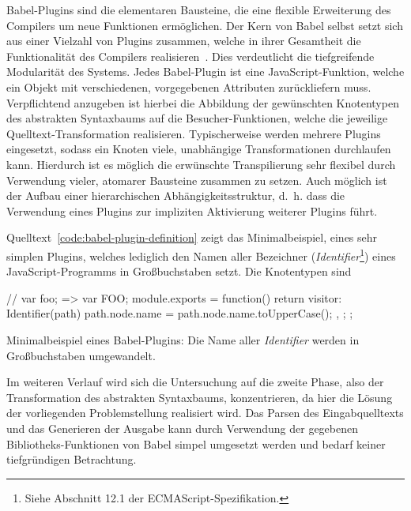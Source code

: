 Babel-Plugins sind die elementaren Bausteine, die eine flexible Erweiterung des Compilers um neue Funktionen ermöglichen. Der Kern von Babel selbst setzt sich aus einer Vielzahl von Plugins zusammen, welche in ihrer Gesamtheit die Funktionalität des Compilers realisieren~\autocite{BABEL}. Dies verdeutlicht die tiefgreifende Modularität des Systems. Jedes Babel-Plugin ist eine JavaScript-Funktion, welche ein Objekt mit verschiedenen, vorgegebenen Attributen zurückliefern muss. Verpflichtend anzugeben ist hierbei die Abbildung der gewünschten Knotentypen des abstrakten Syntaxbaums auf die Besucher-Funktionen, welche die jeweilige Quelltext-Transformation realisieren. Typischerweise werden mehrere Plugins eingesetzt, sodass ein Knoten viele, unabhängige Transformationen durchlaufen kann. Hierdurch ist es möglich die erwünschte Transpilierung sehr flexibel durch Verwendung vieler, atomarer Bausteine zusammen zu setzen. Auch möglich ist der Aufbau einer hierarchischen Abhängigkeitsstruktur, d.~h. dass die Verwendung eines Plugins zur impliziten Aktivierung weiterer Plugins führt.

Quelltext~\ref{code:babel-plugin-definition} zeigt das Minimalbeispiel, eines sehr simplen Plugins, welches lediglich den Namen aller Bezeichner (\textit{Identifier}\footnote{Siehe Abschnitt 12.1 der ECMAScript-Spezifikation\autocite[187\psqq]{ECMASCRIPT:2019}.}) eines JavaScript-Programms in Großbuchstaben setzt. Die Knotentypen sind

\bigskip
\begin{listing}[htb]
\begin{jscode}
// var foo; => var FOO;
module.exports = function() {
  return {
    visitor: {
      Identifier(path) {
        path.node.name = path.node.name.toUpperCase();
      },
    }
  };
};
\end{jscode}
\caption[Minimalbeispiel eines Babel-Plugins]{Minimalbeispiel eines Babel-Plugins: Die Name aller \textit{Identifier} werden in Großbuchstaben umgewandelt.}
\label{code:babel-plugin-definition}
\end{listing}

Im weiteren Verlauf wird sich die Untersuchung auf die zweite Phase, also der Transformation des abstrakten Syntaxbaums, konzentrieren, da hier die Lösung der vorliegenden Problemstellung realisiert wird. Das Parsen des Eingabquelltexts und das Generieren der Ausgabe kann durch Verwendung der gegebenen Bibliotheks-Funktionen von Babel simpel umgesetzt werden und bedarf keiner tiefgründigen Betrachtung.
